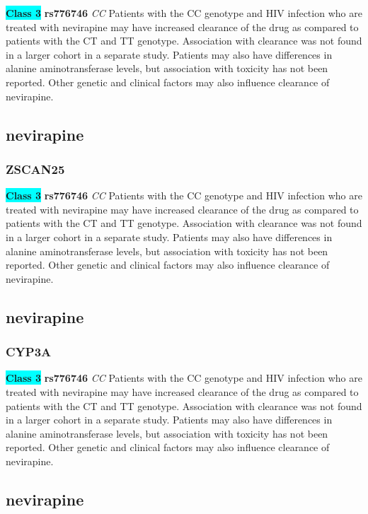 \documentclass{book}
\begin{document}
\begin{center}
\textbf{\colorbox{cyan} {Class 3}} \textbf{ rs776746 } \textit{ CC }
Patients with the CC genotype and HIV infection who are treated with nevirapine may have increased clearance of the drug as compared to patients with the CT and TT genotype. Association with clearance was not found in a larger cohort in a separate study. Patients may also have differences in alanine aminotransferase levels, but association with toxicity has not been reported. Other genetic and clinical factors may also influence clearance of nevirapine.


\end{center}\subsection{ nevirapine }


\subsubsection{ ZSCAN25 }

\begin{center}
\textbf{\colorbox{cyan} {Class 3}} \textbf{ rs776746 } \textit{ CC }
Patients with the CC genotype and HIV infection who are treated with nevirapine may have increased clearance of the drug as compared to patients with the CT and TT genotype. Association with clearance was not found in a larger cohort in a separate study. Patients may also have differences in alanine aminotransferase levels, but association with toxicity has not been reported. Other genetic and clinical factors may also influence clearance of nevirapine.


\end{center}\subsection{ nevirapine }


\subsubsection{ CYP3A }

\begin{center}
\textbf{\colorbox{cyan} {Class 3}} \textbf{ rs776746 } \textit{ CC }
Patients with the CC genotype and HIV infection who are treated with nevirapine may have increased clearance of the drug as compared to patients with the CT and TT genotype. Association with clearance was not found in a larger cohort in a separate study. Patients may also have differences in alanine aminotransferase levels, but association with toxicity has not been reported. Other genetic and clinical factors may also influence clearance of nevirapine.


\end{center}\subsection{ nevirapine }
\end{document}
